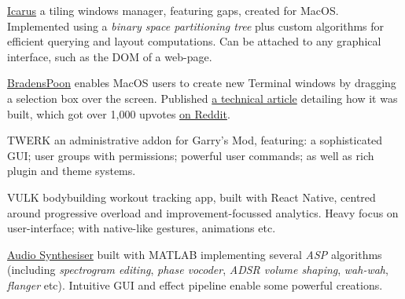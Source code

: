 
\begin{cvopensource}
  \cvproject
    {\href{https://github.com/Braden1996/Icarus}{Icarus}}
    {
      a tiling windows manager, featuring gaps, created for MacOS. Implemented using a \textit{binary space partitioning tree} plus custom algorithms for efficient querying and layout computations. Can be attached to any graphical interface, such as the DOM of a web-page.
    }

  \cvproject
    {\href{https://github.com/Braden1996/BradensPoon}{BradensPoon}}
    {
      enables MacOS users to create new Terminal windows by dragging a selection box over the screen. Published \href{https://blog.theodo.fr/2018/03/making-runtime-funtime-hammerspoon/}{a technical article} detailing how it was built, which got over 1,000 upvotes \href{https://www.reddit.com/r/unixporn/comments/82opm5/ocmacos_drawing_iterm_windows/}{on Reddit}.
    }

  \cvproject
    {TWERK}
    {
      an administrative addon for Garry's Mod, featuring: a sophisticated GUI; user groups with permissions; powerful user commands; as well as rich plugin and theme systems.
    }

  \cvproject
    {VULK}
    {
      bodybuilding workout tracking app, built with React Native, centred around progressive overload and improvement-focussed analytics. Heavy focus on user-interface; with native-like gestures, animations etc.
    }

  \cvproject
    {\href{https://github.com/Braden1996/Audio-Synthesiser}{Audio Synthesiser}}
    {
      built with MATLAB implementing several \textit{ASP} algorithms (including \textit{spectrogram editing}, \textit{phase vocoder}, \textit{ADSR volume shaping}, \textit{wah-wah}, \textit{flanger} etc). Intuitive GUI and effect pipeline enable some powerful creations.
    }
\end{cvopensource}

